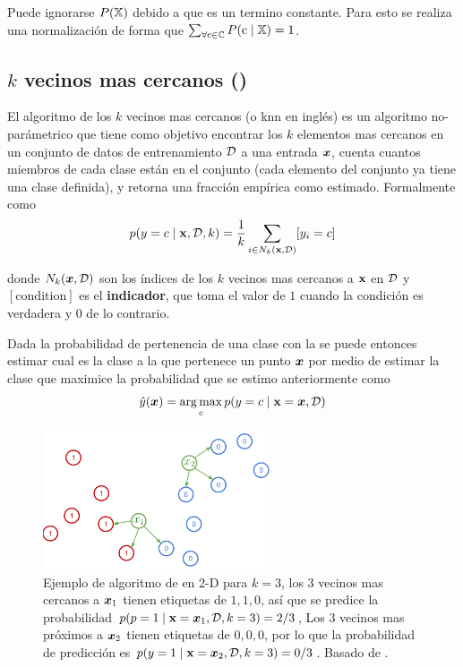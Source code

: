 Puede ignorarse $P({\mathbb{X}})$ debido a que es un termino constante. Para esto se realiza una normalización de forma que $\sum_{\forall {\textnormal{c}} \in {\mathbb{C}}} P({\textnormal{c}}\mid {\mathbb{X}}) = 1$.


\subsection{$k$ vecinos mas cercanos ()}
El algoritmo de los $k$ vecinos mas cercanos (o \gls{knn} en inglés) es un algoritmo no-parámetrico que tiene como objetivo encontrar los $k$ elementos mas cercanos en un conjunto de datos de entrenamiento $\mathcal{D}$ a una entrada ${\bm{x}}$, cuenta cuantos miembros de cada clase están en el conjunto (cada elemento del conjunto ya tiene una clase definida), y retorna una fracción empírica como estimado. Formalmente como
\begin{equation} \label{eq:prob-knn}
  p(y = c \mid {\mathbf{x}}, \mathcal{D}, k) = \frac{1}{k} \sum_{i \in N_k({\mathbf{x}}, \mathcal{D})} [y_i = c]
\end{equation}

donde $N_k({\bm{x}}, \mathcal{D})$ son los índices de los $k$ vecinos mas cercanos a ${\mathbf{x}}$ en $\mathcal{D}$ y $[\mathrm{condition}]$ es el \textbf{indicador}, que toma el valor de $1$ cuando la condición es verdadera y $0$ de lo contrario.

Dada la probabilidad de pertenencia de una clase con la  se puede entonces estimar cual es la clase a la que pertenece un punto ${\bm{x}}$ por medio de estimar la clase que maximice la probabilidad que se estimo anteriormente como
\begin{equation}
  \hat{y}({\bm{x}}) = \operatorname*{arg\,max}_{c} p(y = c \mid {\mathbf{x}} = {\bm{x}}, \mathcal{D})
\end{equation}

\begin{figure}[H]
  \centering
  \includegraphics[width=0.60\textwidth]{Figures/knn-example.pdf}
  \decoRule
  \caption[Ejemplo de algoritmo de \textsl{}]{Ejemplo de algoritmo de \textsl{} en 2-D para $k = 3$, los 3 vecinos mas cercanos a ${\bm{x}}_1$ tienen etiquetas de $1, 1, 0$, así que se predice la probabilidad $p(p = 1 \mid {\mathbf{x}} = {\bm{x}}_1, \mathcal{D}, k=3) = 2/3$, Los 3 vecinos mas próximos a ${\bm{x}}_2$ tienen etiquetas de $0, 0, 0$, por lo que la probabilidad de predicción es $p(y=1 \mid {\mathbf{x}} = {\bm{x}}_2, \mathcal{D}, k=3) = 0/3$. Basado de \cite{murphymachinel}.}
  \label{fig:knn-example}
\end{figure}

